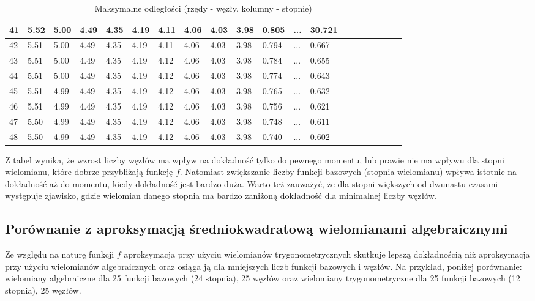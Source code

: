 \documentclass{article}
\begin{document}
\begin{table}[H]
\begin{adjustwidth}{-.6in}{-.6in}
\begin{tabular}{|l|l|l|l|l|l|l|l|l|l|l|l|l|l|l|l|l|l|l|l|}
41 & 5.52 & 5.00 & 4.49 & 4.35 & 4.19 & 4.11 & 4.06 & 4.03 & 3.98 & 0.805 & ... & 30.721 \\ \hline
42 & 5.51 & 5.00 & 4.49 & 4.35 & 4.19 & 4.11 & 4.06 & 4.03 & 3.98 & 0.794 & ... & 0.667 \\ \hline
43 & 5.51 & 5.00 & 4.49 & 4.35 & 4.19 & 4.12 & 4.06 & 4.03 & 3.98 & 0.784 & ... & 0.655 \\ \hline
44 & 5.51 & 5.00 & 4.49 & 4.35 & 4.19 & 4.12 & 4.06 & 4.03 & 3.98 & 0.774 & ... & 0.643 \\ \hline
45 & 5.51 & 4.99 & 4.49 & 4.35 & 4.19 & 4.12 & 4.06 & 4.03 & 3.98 & 0.765 & ... & 0.632 \\ \hline
46 & 5.51 & 4.99 & 4.49 & 4.35 & 4.19 & 4.12 & 4.06 & 4.03 & 3.98 & 0.756 & ... & 0.621 \\ \hline
47 & 5.50 & 4.99 & 4.49 & 4.35 & 4.19 & 4.12 & 4.06 & 4.03 & 3.98 & 0.748 & ... & 0.611 \\ \hline
48 & 5.50 & 4.99 & 4.49 & 4.35 & 4.19 & 4.12 & 4.06 & 4.03 & 3.98 & 0.740 & ... & 0.602 \\ \hline
\end{tabular}
\end{adjustwidth}
\caption{Maksymalne odległości (rzędy - węzły, kolumny - stopnie)}
\end{table}

Z tabel wynika, że wzrost liczby węzłów ma wpływ na dokładność tylko do pewnego momentu, lub prawie nie ma wpływu dla stopni
wielomianu, które dobrze przybliżają funkcję $f$. Natomiast zwiększanie liczby funkcji bazowych (stopnia wielomianu) wpływa istotnie na
dokładność aż do momentu, kiedy dokładność jest bardzo duża. Warto też zauważyć, że dla stopni większych od dwunastu czasami
występuje zjawisko, gdzie wielomian danego stopnia ma bardzo zaniżoną dokładność dla minimalnej liczby węzłów.

\subsection{Porównanie z aproksymacją średniokwadratową wielomianami algebraicznymi}
Ze względu na naturę funkcji $f$ aproksymacja przy użyciu wielomianów trygonometrycznych skutkuje lepszą dokładnością niż aproksymacja
przy użyciu wielomianów algebraicznych oraz osiąga ją dla mniejszych liczb funkcji bazowych i węzłów. Na przykład, poniżej porównanie:
wielomiany algebraiczne dla 25 funkcji bazowych (24 stopnia), 25 węzłów oraz wielomiany trygonometryczne dla 25 funkcji bazowych 
(12 stopnia), 25 węzłów.
\end{document}
